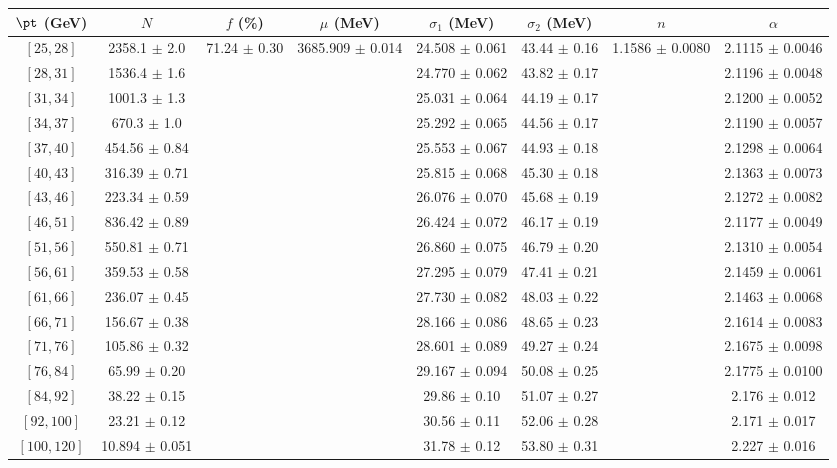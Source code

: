\begin{tabular}{c||c|c|c|c|c|c|c}
$\pt$ (GeV) & $N$ & $f$ (\%) & $\mu$ (MeV) & $\sigma_1$ (MeV) & $\sigma_2$ (MeV) & $n$ & $\alpha$ \\
\hline
$[25, 28]$ & 2358.1 $\pm$ 2.0 & \multirow{17}{*}{71.24 $\pm$ 0.30} & \multirow{17}{*}{3685.909 $\pm$ 0.014} & 24.508 $\pm$ 0.061 & 43.44 $\pm$ 0.16 & \multirow{17}{*}{1.1586 $\pm$ 0.0080} & 2.1115 $\pm$ 0.0046\\
$[28, 31]$ & 1536.4 $\pm$ 1.6 &  &  & 24.770 $\pm$ 0.062 & 43.82 $\pm$ 0.17 &  & 2.1196 $\pm$ 0.0048\\
$[31, 34]$ & 1001.3 $\pm$ 1.3 &  &  & 25.031 $\pm$ 0.064 & 44.19 $\pm$ 0.17 &  & 2.1200 $\pm$ 0.0052\\
$[34, 37]$ & 670.3 $\pm$ 1.0 &  &  & 25.292 $\pm$ 0.065 & 44.56 $\pm$ 0.17 &  & 2.1190 $\pm$ 0.0057\\
$[37, 40]$ & 454.56 $\pm$ 0.84 &  &  & 25.553 $\pm$ 0.067 & 44.93 $\pm$ 0.18 &  & 2.1298 $\pm$ 0.0064\\
$[40, 43]$ & 316.39 $\pm$ 0.71 &  &  & 25.815 $\pm$ 0.068 & 45.30 $\pm$ 0.18 &  & 2.1363 $\pm$ 0.0073\\
$[43, 46]$ & 223.34 $\pm$ 0.59 &  &  & 26.076 $\pm$ 0.070 & 45.68 $\pm$ 0.19 &  & 2.1272 $\pm$ 0.0082\\
$[46, 51]$ & 836.42 $\pm$ 0.89 &  &  & 26.424 $\pm$ 0.072 & 46.17 $\pm$ 0.19 &  & 2.1177 $\pm$ 0.0049\\
$[51, 56]$ & 550.81 $\pm$ 0.71 &  &  & 26.860 $\pm$ 0.075 & 46.79 $\pm$ 0.20 &  & 2.1310 $\pm$ 0.0054\\
$[56, 61]$ & 359.53 $\pm$ 0.58 &  &  & 27.295 $\pm$ 0.079 & 47.41 $\pm$ 0.21 &  & 2.1459 $\pm$ 0.0061\\
$[61, 66]$ & 236.07 $\pm$ 0.45 &  &  & 27.730 $\pm$ 0.082 & 48.03 $\pm$ 0.22 &  & 2.1463 $\pm$ 0.0068\\
$[66, 71]$ & 156.67 $\pm$ 0.38 &  &  & 28.166 $\pm$ 0.086 & 48.65 $\pm$ 0.23 &  & 2.1614 $\pm$ 0.0083\\
$[71, 76]$ & 105.86 $\pm$ 0.32 &  &  & 28.601 $\pm$ 0.089 & 49.27 $\pm$ 0.24 &  & 2.1675 $\pm$ 0.0098\\
$[76, 84]$ & 65.99 $\pm$ 0.20 &  &  & 29.167 $\pm$ 0.094 & 50.08 $\pm$ 0.25 &  & 2.1775 $\pm$ 0.0100\\
$[84, 92]$ & 38.22 $\pm$ 0.15 &  &  & 29.86 $\pm$ 0.10 & 51.07 $\pm$ 0.27 &  & 2.176 $\pm$ 0.012\\
$[92, 100]$ & 23.21 $\pm$ 0.12 &  &  & 30.56 $\pm$ 0.11 & 52.06 $\pm$ 0.28 &  & 2.171 $\pm$ 0.017\\
$[100, 120]$ & 10.894 $\pm$ 0.051 &  &  & 31.78 $\pm$ 0.12 & 53.80 $\pm$ 0.31 &  & 2.227 $\pm$ 0.016\\
\end{tabular}
